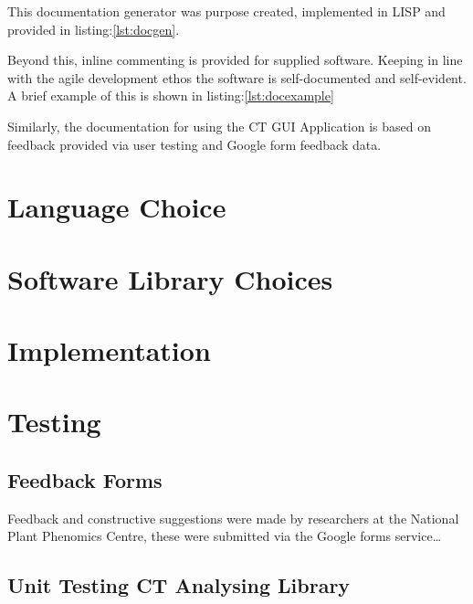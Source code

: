 \documentclass[11pt]{report}
\begin{document}
This documentation generator was purpose created, implemented in LISP and provided in listing:\ref{lst:docgen}.

Beyond this, inline commenting is provided for supplied software. Keeping in line with the agile development ethos the software is self-documented and self-evident. A brief example of this is shown in listing:\ref{lst:docexample}

Similarly, the documentation for using the CT GUI Application is based on feedback provided via user testing and Google form feedback data.
\section{Language Choice}
\label{sec-2-6}
\section{Software Library Choices}
\label{sec-2-7}
\section{Implementation}
\label{sec-2-8}

\section{Testing}
\label{sec-2-9}
\subsection{Feedback Forms}
\label{sec-2-9-1}
Feedback and constructive suggestions were made by researchers at the National Plant Phenomics Centre, these were submitted via the Google forms service\ldots{}
\subsection{Unit Testing CT Analysing Library}
\label{sec-2-9-2}
\end{document}
